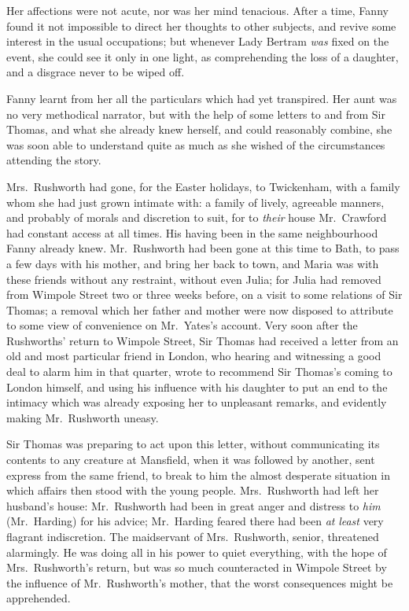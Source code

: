 \documentclass{article}
\begin{document}
Her affections were not acute, nor was her mind tenacious.
After a time, Fanny found it not impossible to direct
her thoughts to other subjects, and revive some interest
in the usual occupations; but whenever Lady Bertram \emph{was}
fixed on the event, she could see it only in one light,
as comprehending the loss of a daughter, and a disgrace
never to be wiped off.

Fanny learnt from her all the particulars which had
yet transpired.  Her aunt was no very methodical narrator,
but with the help of some letters to and from Sir Thomas,
and what she already knew herself, and could reasonably
combine, she was soon able to understand quite as much
as she wished of the circumstances attending the story.

Mrs.\ Rushworth had gone, for the Easter holidays,
to Twickenham, with a family whom she had just grown
intimate with:  a family of lively, agreeable manners,
and probably of morals and discretion to suit, for to \emph{their}
house Mr.\ Crawford had constant access at all times.
His having been in the same neighbourhood Fanny already knew.
Mr.\ Rushworth had been gone at this time to Bath, to pass
a few days with his mother, and bring her back to town,
and Maria was with these friends without any restraint,
without even Julia; for Julia had removed from Wimpole Street
two or three weeks before, on a visit to some relations
of Sir Thomas; a removal which her father and mother were
now disposed to attribute to some view of convenience
on Mr.\ Yates's account.  Very soon after the Rushworths'
return to Wimpole Street, Sir Thomas had received a
letter from an old and most particular friend in London,
who hearing and witnessing a good deal to alarm him
in that quarter, wrote to recommend Sir Thomas's coming
to London himself, and using his influence with his
daughter to put an end to the intimacy which was already
exposing her to unpleasant remarks, and evidently making
Mr.\ Rushworth uneasy.

Sir Thomas was preparing to act upon this letter, without
communicating its contents to any creature at Mansfield,
when it was followed by another, sent express from the
same friend, to break to him the almost desperate situation
in which affairs then stood with the young people.
Mrs.\ Rushworth had left her husband's house:  Mr.\ Rushworth
had been in great anger and distress to \emph{him} (Mr.\ Harding)
for his advice; Mr.\ Harding feared there had been \emph{at}
\emph{least} very flagrant indiscretion.  The maidservant
of Mrs.\ Rushworth, senior, threatened alarmingly.  He was
doing all in his power to quiet everything, with the hope
of Mrs.\ Rushworth's return, but was so much counteracted
in Wimpole Street by the influence of Mr.\ Rushworth's mother,
that the worst consequences might be apprehended.
\end{document}
